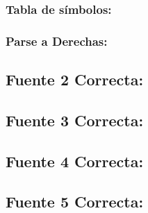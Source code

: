 \documentclass[a4paper, 12pt]{article}
\begin{document}
\subsubsection*{Tabla de símbolos:}

\subsubsection*{Parse a Derechas:}





\subsection*{Fuente 2 Correcta:}


\subsection*{Fuente 3 Correcta:}


\subsection*{Fuente 4 Correcta:}

\newpage
\subsection*{Fuente 5 Correcta:}

\end{document}
